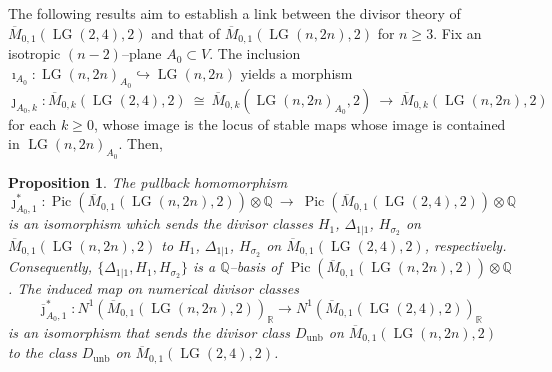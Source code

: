 \documentclass[10pt]{amsart}
\newtheorem{proposition}[theorem]{Proposition}
\theoremstyle{definition}
\newcommand{\R}{\mathbb{R}}
\newcommand{\LG}{\operatorname{LG}}
\newcommand{\QQ}{\mathbb{Q}}
\DeclareMathOperator{\unb}{unb}
\theoremstyle{plain} %
\begin{document}
The following results aim to establish a link between the divisor theory of $\overline{M}_{0,1}(\LG(2,4),2)$ and that of $\overline{M}_{0,1}(\LG(n,2n),2)$ for $n\geq 3$.  
Fix an isotropic $(n-2)$--plane $A_0\subset V$. The inclusion $\imath_{A_0}\colon\LG(n,2n)_{A_0}\hookrightarrow \LG(n,2n)$ yields a morphism
\[
\jmath_{A_0,k}\colon\overline{M}_{0,k}(\LG(2,4),2)\ \cong\ \overline{M}_{0,k}(\LG(n,2n)_{A_0},2)\ \longrightarrow\ \overline{M}_{0,k}(\LG(n,2n),2)
\]
for each $k\ge 0$, 
whose image is the locus of stable maps whose image is contained in $\LG(n,2n)_{A_0}$.
Then, 
\begin{proposition}\label{lem:rank-two-immersion} The pullback homomorphism
\[
\jmath_{A_0,1}^*\colon\operatorname{Pic}(\overline{M}_{0,1}(\LG(n,2n),2))\otimes\QQ
\ \longrightarrow\
\operatorname{Pic}(\overline{M}_{0,1}(\LG(2,4),2))\otimes\QQ
\]
is an isomorphism which sends the divisor classes $H_1$, $\Delta_{1|1}$, $H_{\sigma_2}$ on $\overline{M}_{0,1}(\LG(n,2n),2)$ to $H_1$, $\Delta_{1|1}$, $H_{\sigma_2}$ on $\overline{M}_{0,1}(\LG(2,4),2)$, respectively. Consequently, $\{\Delta_{1|1},H_1,H_{\sigma_2}\}$ is a $\QQ$--basis of $\operatorname{Pic}(\overline{M}_{0,1}(\LG(n,2n),2))\otimes\QQ$. The induced map on numerical divisor classes 
\begin{equation*}
\overline\jmath^*_{A_0,1}:N^1(\overline{M}_{0,1}(\LG(n,2n),2))_{\R}\longrightarrow N^1(\overline{M}_{0,1}(\LG(2,4),2))_{\R}  
\end{equation*} 
is an isomorphism that sends the divisor class  $D_{\unb}$ on $\overline{M}_{0,1}(\LG(n,2n),2)$ to the class  $D_{\unb}$ on $\overline{M}_{0,1}(\LG(2,4),2)$. 
\end{proposition}
\end{document}

